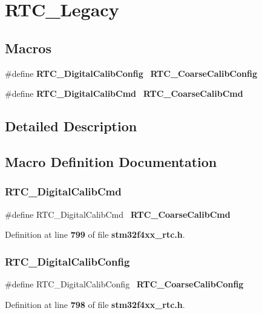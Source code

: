\section{R\+T\+C\+\_\+\+Legacy}
\label{group__RTC__Legacy}
\subsection*{Macros}
\begin{DoxyCompactItemize}
\item 
\#define \textbf{ R\+T\+C\+\_\+\+Digital\+Calib\+Config}~\textbf{ R\+T\+C\+\_\+\+Coarse\+Calib\+Config}
\item 
\#define \textbf{ R\+T\+C\+\_\+\+Digital\+Calib\+Cmd}~\textbf{ R\+T\+C\+\_\+\+Coarse\+Calib\+Cmd}
\end{DoxyCompactItemize}


\subsection{Detailed Description}


\subsection{Macro Definition Documentation}
\mbox{\label{group__RTC__Legacy_ga8a04a24beeae55e24cf8d2f3dbb5ead5}} 
\subsubsection{R\+T\+C\+\_\+\+Digital\+Calib\+Cmd}
{\footnotesize\ttfamily \#define R\+T\+C\+\_\+\+Digital\+Calib\+Cmd~\textbf{ R\+T\+C\+\_\+\+Coarse\+Calib\+Cmd}}



Definition at line \textbf{ 799} of file \textbf{ stm32f4xx\+\_\+rtc.\+h}.

\mbox{\label{group__RTC__Legacy_ga6fd6ce83a6c888a7613e641d4478c0cc}} 
\subsubsection{R\+T\+C\+\_\+\+Digital\+Calib\+Config}
{\footnotesize\ttfamily \#define R\+T\+C\+\_\+\+Digital\+Calib\+Config~\textbf{ R\+T\+C\+\_\+\+Coarse\+Calib\+Config}}



Definition at line \textbf{ 798} of file \textbf{ stm32f4xx\+\_\+rtc.\+h}.

